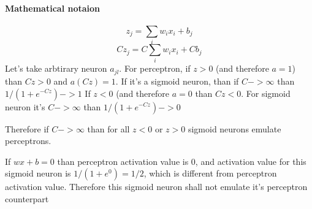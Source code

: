 \documentclass{article}
\begin{document}
\paragraph{Mathematical notaion} 
\begin{equation*}
  z_{j} = \sum_{i}w_ix_i + b_j
\end{equation*}
\begin{equation*}
  Cz_{j} = C\sum_{i}w_ix_i + Cb_j
\end{equation*}
Let's take arbtirary neuron $a_{jl}$. For perceptron, if $z > 0$ (and therefore $a = 1$) than $Cz > 0$ and $a(Cz)=1$. 
If it's a sigmoid neuron, than if $C -> \infty$ than $1/(1 + e^{-Cz}) -> 1$
If $z < 0$  (and therefore $a = 0$ than $Cz < 0$. For sigmoid neuron it's $C -> \infty$ than $1/(1 + e^{-Cz}) -> 0$

Therefore if $C -> \infty$ than for all $z < 0$ or $z > 0$ sigmoid neurons emulate perceptrons.

If $wx + b = 0$ than perceptron activation value is $0$, and activation value for this sigmoid neuron is
$1/(1 + e ^ 0) = 1/2$, which is different from perceptron activation value. Therefore this sigmoid neuron shall not emulate
it's perceptron counterpart
\end{document}
